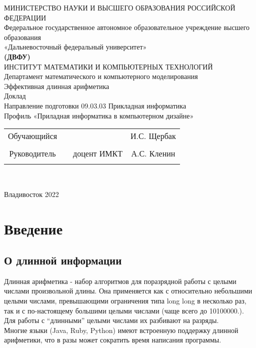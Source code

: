 \documentclass[a4paper]{article}
\begin{document}
 
 
\begin{center}
\hfill \break
\large{МИНИСТЕРСТВО НАУКИ И ВЫСШЕГО ОБРАЗОВАНИЯ РОССИЙСКОЙ ФЕДЕРАЦИИ}\\
\footnotesize{Федеральное государственное автономное образовательное учреждение высшего образования}\\ 
\footnotesize{«Дальневосточный федеральный университет»}\\
\small{\textbf{(ДВФУ)}}\\
\hfill \break
\normalsize{ИНСТИТУТ МАТЕМАТИКИ И КОМПЬЮТЕРНЫХ ТЕХНОЛОГИЙ}\\
 \hfill \break
\normalsize{Департамент математического и компьютерного моделирования}\\
\hfill\break
\hfill \break
\hfill \break
\hfill \break
\large{Эффективная длинная арифметика}\\
\hfill \break
\hfill \break
\hfill \break
\normalsize{Доклад\\
\hfill \break
Направление подготовки 09.03.03 Прикладная информатика\\
\hfill \break
Профиль «Приладная информатика в компьютерном дизайне»}\\
\hfill \break
\hfill \break
\end{center}
 
\normalsize{} \hfill \break
\hfill \break
 
\normalsize{ 
\begin{tabular}{cccc}
Обучающийся & \underline{\hspace{3cm}} & &И.С. Щербак \\\\
Руководитель & \underline{\hspace{3cm}}& доцент ИМКТ &А.С. Кленин \\\\
\end{tabular}
}\\
\hfill \break
\hfill \break
\begin{center} Владивосток 2022 \end{center}
\thispagestyle{empty} 
 
\newpage
     
    \tableofcontents 
\newpage

\section{Введение}
\subsection{О длинной информации}
Длинная арифметика - набор алгоритмов для поразрядной работы с целыми числами произвольной длины. Она применяется как с относительно небольшими целыми числами, превышающими ограничения типа long long в несколько раз, так и с по-настоящему большими целыми числами (чаще всего до 10100000.). Для работы с “длинными” целыми числами их разбивают на разряды.
\\Многие языки (Java, Ruby, Python) имеют встроенную поддержку длинной арифметики, что в разы может сократить время написания программы.
\end{document}
